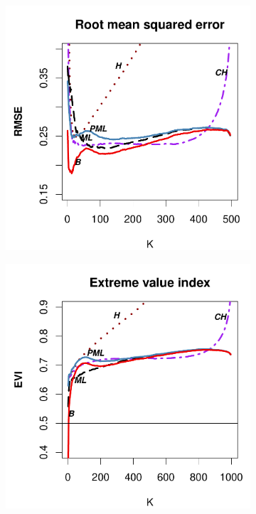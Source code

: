 \begin{figure}[h]
\begin{subfigure}[h]{0.40\linewidth}
		\end{subfigure}
		\hspace{\fill}
		\begin{subfigure}[h]{0.40\linewidth}
			\includegraphics[width=\textwidth]{./plots/paper1/RMSE_Outputloggamma0,5500.pdf}
		\end{subfigure}
		\bigskip
		\centering
		\begin{subfigure}[h]{0.40\linewidth}
			\includegraphics[width=\textwidth]{./plots/paper1/EVI_Outputloggamma0,51000.pdf}

\end{subfigure}
\end{figure}
